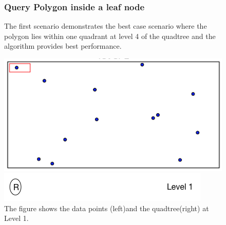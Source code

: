 \documentclass{article}
\begin{document}
\clearpage
\begin{figure}[ht]
\subsubsection{Query Polygon inside a leaf node}


The first scenario demonstrates the best case scenario where the polygon lies within one quadrant at level 4 of the quadtree and the algorithm provides best performance.


\caption{The figure shows the data points (left)and the quadtree(right) at Level 1.}
  \centering
  \begin{minipage}[b]{0.35\textwidth}
    \includegraphics[width=\textwidth]{1_1Quad1_1}  
  \end{minipage}
  \hfill
  \begin{minipage}[b]{0.5\textwidth}
    \includegraphics[width=\textwidth]{1_1Quad_1_tree}
  \end{minipage}
\end{figure}
\end{document}

